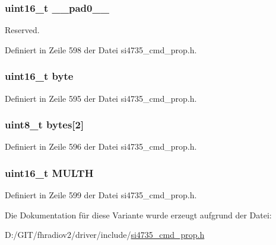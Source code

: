 \subsubsection[{\+\_\+\+\_\+pad0\+\_\+\+\_\+}]{\setlength{\rightskip}{0pt plus 5cm}uint16\+\_\+t \+\_\+\+\_\+pad0\+\_\+\+\_\+}\label{unionfm__rsq__multi__hi__thres_a77132c2c26a75f5b8751b235cda23828}


Reserved. 



Definiert in Zeile 598 der Datei si4735\+\_\+cmd\+\_\+prop.\+h.

\hypertarget{unionfm__rsq__multi__hi__thres_ab0549c1b5ea980a02e7eab77e21fea49}{}
\subsubsection[{byte}]{\setlength{\rightskip}{0pt plus 5cm}uint16\+\_\+t byte}\label{unionfm__rsq__multi__hi__thres_ab0549c1b5ea980a02e7eab77e21fea49}


Definiert in Zeile 595 der Datei si4735\+\_\+cmd\+\_\+prop.\+h.

\hypertarget{unionfm__rsq__multi__hi__thres_a46e4c05d20a047ec169f60d3167e912e}{}
\subsubsection[{bytes}]{\setlength{\rightskip}{0pt plus 5cm}uint8\+\_\+t bytes\mbox{[}2\mbox{]}}\label{unionfm__rsq__multi__hi__thres_a46e4c05d20a047ec169f60d3167e912e}


Definiert in Zeile 596 der Datei si4735\+\_\+cmd\+\_\+prop.\+h.

\hypertarget{unionfm__rsq__multi__hi__thres_ae82179b893ce2b80c7dda73e56b83972}{}
\subsubsection[{M\+U\+L\+T\+H}]{\setlength{\rightskip}{0pt plus 5cm}uint16\+\_\+t M\+U\+L\+T\+H}\label{unionfm__rsq__multi__hi__thres_ae82179b893ce2b80c7dda73e56b83972}


Definiert in Zeile 599 der Datei si4735\+\_\+cmd\+\_\+prop.\+h.



Die Dokumentation für diese Variante wurde erzeugt aufgrund der Datei\+:\begin{DoxyCompactItemize}
\item 
D\+:/\+G\+I\+T/fhradiov2/driver/include/\hyperlink{si4735__cmd__prop_8h}{si4735\+\_\+cmd\+\_\+prop.\+h}\end{DoxyCompactItemize}

